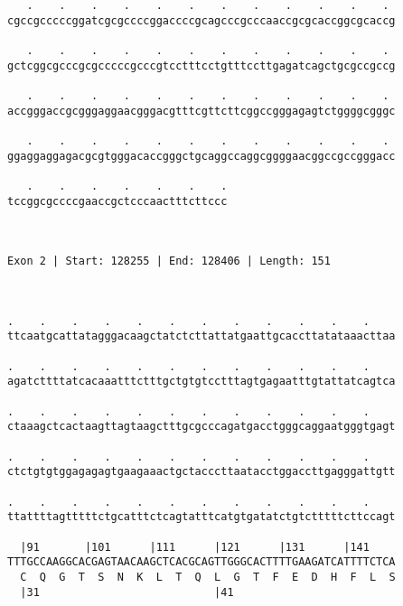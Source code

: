 \documentclass{article}
\begin{document}
\begin{Verbatim}
   .    .    .    .    .    .    .    .    .    .    .    . 
cgccgcccccggatcgcgccccggaccccgcagcccgcccaaccgcgcaccggcgcaccg
                                                            
   .    .    .    .    .    .    .    .    .    .    .    . 
gctcggcgcccgcgcccccgcccgtcctttcctgtttccttgagatcagctgcgccgccg
                                                            
   .    .    .    .    .    .    .    .    .    .    .    . 
accgggaccgcgggaggaacgggacgtttcgttcttcggccgggagagtctggggcgggc
                                                            
   .    .    .    .    .    .    .    .    .    .    .    . 
ggaggaggagacgcgtgggacaccgggctgcaggccaggcggggaacggccgccgggacc
                                                            
   .    .    .    .    .    .    .
tccggcgccccgaaccgctcccaactttcttccc
                                  
                                  
 
Exon 2 | Start: 128255 | End: 128406 | Length: 151



.    .    .    .    .    .    .    .    .    .    .    .    
ttcaatgcattatagggacaagctatctcttattatgaattgcaccttatataaacttaa
                                                            
.    .    .    .    .    .    .    .    .    .    .    .    
agatcttttatcacaaatttctttgctgtgtcctttagtgagaatttgtattatcagtca
                                                            
.    .    .    .    .    .    .    .    .    .    .    .    
ctaaagctcactaagttagtaagctttgcgcccagatgacctgggcaggaatgggtgagt
                                                            
.    .    .    .    .    .    .    .    .    .    .    .    
ctctgtgtggagagagtgaagaaactgctacccttaatacctggaccttgagggattgtt
                                                            
.    .    .    .    .    .    .    .    .    .    .    .    
ttattttagtttttctgcatttctcagtatttcatgtgatatctgtctttttcttccagt
                                                            
  |91       |101      |111      |121      |131      |141    
TTTGCCAAGGCACGAGTAACAAGCTCACGCAGTTGGGCACTTTTGAAGATCATTTTCTCA
  C  Q  G  T  S  N  K  L  T  Q  L  G  T  F  E  D  H  F  L  S
  |31                           |41                         
  

\end{Verbatim}
\end{document}
